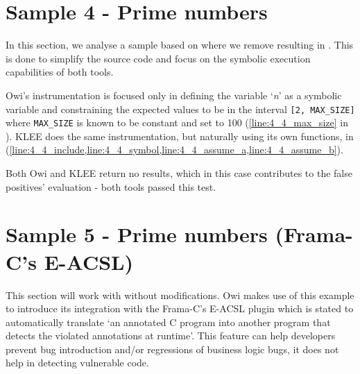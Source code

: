 \section{Sample 4 - Prime numbers}\label{section:sample_4}

In this section, we analyse a sample based on  where we remove  resulting in . This is done to simplify the source code and focus on the symbolic execution capabilities of both tools.

Owi's instrumentation is focused only in defining the variable `\textit{n}' as a symbolic variable and constraining the expected values to be in the interval \lstinline$[2, MAX_SIZE]$ where \lstinline$MAX_SIZE$ is known to be constant and set to 100 (\cref{line:4_4_max_size} in ). KLEE does the same instrumentation, but naturally using its own functions, in  (\cref{line:4_4_include,line:4_4_symbol,line:4_4_assume_a,line:4_4_assume_b}).

Both Owi and KLEE return no results, which in this case contributes to the false positives' evaluation - both tools passed this test.




\section{Sample 5 - Prime numbers (Frama-C's E-ACSL)}\label{section:sample_5}

This section will work with  without modifications. Owi makes use of this example to introduce its integration with the Frama-C's E-ACSL plugin which is stated to automatically translate `an annotated C program into another program that detects the violated annotations at runtime'. This feature can help developers prevent bug introduction and/or regressions of business logic bugs, it does not help in detecting vulnerable code.

